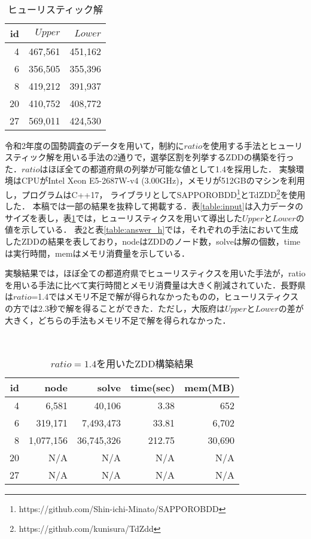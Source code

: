 \documentclass[twoside,twocolumn,11pt]{jarticle}  %
\begin{document}
\begin{table}
　　　\small
  \caption{ヒューリスティック解}
  \label{table:huristic}
  \centering
  
  \begin{tabular}{r|rr}
    \hline
    id & $Upper$ & $Lower$ \\
    \hline\hline
    4 & 467{,}561 & 451{,}162 \\
    6 & 356{,}505 & 355{,}396 \\
    8 & 419{,}212 & 391{,}937 \\
    20 & 410{,}752 & 408{,}772 \\
    27 & 569{,}011 & 424{,}530 \\
  \end{tabular}
\end{table}

令和2年度の国勢調査のデータを用いて，制約に$ratio$を使用する手法とヒューリスティック解を用いる手法の2通りで，選挙区割を列挙するZDDの構築を行った．$ratio$はほぼ全ての都道府県の列挙が可能な値として1.4を採用した．
実験環境はCPUがIntel Xeon E5-2687W-v4 (3.00GHz)，メモリが512GBのマシンを利用し，プログラムはC++17，
ライブラリとしてSAPPOROBDD\footnote{\scriptsize{https://github.com/Shin-ichi-Minato/SAPPOROBDD}}とTdZDD\footnote{\scriptsize{https://github.com/kunisura/TdZdd}}を使用した． 
本稿では一部の結果を抜粋して掲載する．表\ref{table:input}は入力データのサイズを表し，表\ref{table:huristic}では，ヒューリスティクスを用いて導出した$Upper$と$Lower$の値を示している．
表\ref{table:result_r}と表\ref{table:answer_h}では，それぞれの手法において生成したZDDの結果を表しており，nodeはZDDのノード数，solveは解の個数，timeは実行時間，memはメモリ消費量を示している．

実験結果では，ほぼ全ての都道府県でヒューリスティクスを用いた手法が，ratioを用いる手法に比べて実行時間とメモリ消費量は大きく削減されていた．長野県は$ratio$=1.4ではメモリ不足で解が得られなかったものの，ヒューリスティクスの方では2.3秒で解を得ることができた．ただし，大阪府は$Upper$と$Lower$の差が大きく，どちらの手法もメモリ不足で解を得られなかった．

\begin{table}
　　　\small
  \caption{$ratio=1.4$を用いたZDD構築結果}
  \label{table:result_r}
  \centering
  \begin{tabular}{r|rrrr}
    \hline
    id & node & solve & time(sec) & mem(MB) \\
    \hline\hline
    4 & 6{,}581 & 40{,}106 & 3.38 & 652 \\
    6 & 319{,}171 & 7{,}493{,}473 & 33.81 & 6{,}702 \\
    8 & 1{,}077{,}156 & 36{,}745{,}326 & 212.75 & 30{,}690 \\
    20 & N/A & N/A & N/A & N/A \\
    27 & N/A & N/A & N/A & N/A \\
  \end{tabular}
\end{table}
\end{document}
